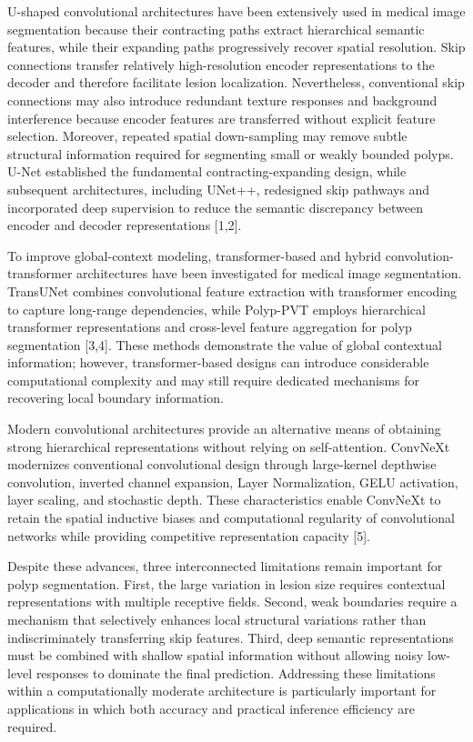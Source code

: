U-shaped convolutional architectures have been extensively used in
medical image segmentation because their contracting paths extract
hierarchical semantic features, while their expanding paths
progressively recover spatial resolution. Skip connections transfer
relatively high-resolution encoder representations to the decoder and
therefore facilitate lesion localization. Nevertheless, conventional
skip connections may also introduce redundant texture responses and
background interference because encoder features are transferred without
explicit feature selection. Moreover, repeated spatial down-sampling may
remove subtle structural information required for segmenting small or
weakly bounded polyps. U-Net established the fundamental
contracting-expanding design, while subsequent architectures, including
UNet++, redesigned skip pathways and incorporated deep supervision to
reduce the semantic discrepancy between encoder and decoder
representations {[}1,2{]}.

To improve global-context modeling, transformer-based and hybrid
convolution-transformer architectures have been investigated for medical
image segmentation. TransUNet combines convolutional feature extraction
with transformer encoding to capture long-range dependencies, while
Polyp-PVT employs hierarchical transformer representations and
cross-level feature aggregation for polyp segmentation {[}3,4{]}. These
methods demonstrate the value of global contextual information; however,
transformer-based designs can introduce considerable computational
complexity and may still require dedicated mechanisms for recovering
local boundary information.

Modern convolutional architectures provide an alternative means of
obtaining strong hierarchical representations without relying on
self-attention. ConvNeXt modernizes conventional convolutional design
through large-kernel depthwise convolution, inverted channel expansion,
Layer Normalization, GELU activation, layer scaling, and stochastic
depth. These characteristics enable ConvNeXt to retain the spatial
inductive biases and computational regularity of convolutional networks
while providing competitive representation capacity {[}5{]}.

Despite these advances, three interconnected limitations remain
important for polyp segmentation. First, the large variation in lesion
size requires contextual representations with multiple receptive fields.
Second, weak boundaries require a mechanism that selectively enhances
local structural variations rather than indiscriminately transferring
skip features. Third, deep semantic representations must be combined
with shallow spatial information without allowing noisy low-level
responses to dominate the final prediction. Addressing these limitations
within a computationally moderate architecture is particularly important
for applications in which both accuracy and practical inference
efficiency are required.

